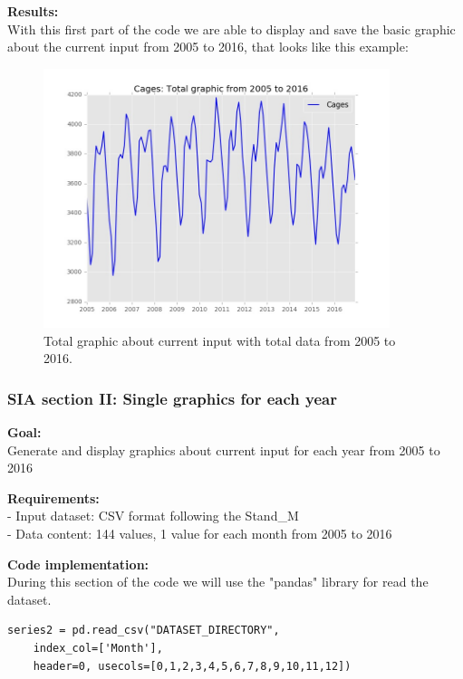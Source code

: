 \begin{minipage}{0.5\textwidth}
\textbf{Results:} \\
With this first part of the code we are able to display and save the basic graphic about the current input from 2005 to 2016, that looks like this example:
\end{minipage} \hfill
\begin{minipage}{0.45\textwidth}
\begin{figure}[H]
\includegraphics[width=0.9\textwidth]{Files/Cages_Total.jpg}
\caption{Total graphic about current input with total data from 2005 to 2016.}
\end{figure}
\end{minipage}


\newpage
\subsubsection{SIA section II: Single graphics for each year}

\textbf{Goal:}\\
Generate and display graphics about current input for each year from 2005 to 2016

\textbf{Requirements:}\\
- Input dataset: CSV format following the Stand\_M \\
- Data content: 144 values, 1 value for each month from 2005 to 2016

\textbf{Code implementation:}\\
During this section of the code we will use the "pandas" library for read the dataset.
\begin{lstlisting}
series2 = pd.read_csv("DATASET_DIRECTORY", 
	index_col=['Month'], 
	header=0, usecols=[0,1,2,3,4,5,6,7,8,9,10,11,12])
\end{lstlisting}

